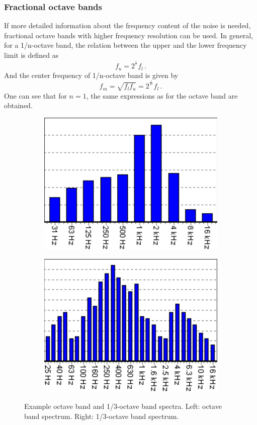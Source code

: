 \subsubsection*{Fractional octave bands}

If more detailed information about the frequency content of the noise is needed, fractional octave bands with higher frequency resolution can be used. In general, for a 1/n-octave band, the relation between the upper and the lower frequency limit is defined as
\begin{equation}
	f_u = 2^{^\frac{1}{n}}f_l\,.
\end{equation}
And the center frequency of 1/n-octave band is given by
\begin{equation}
	f_m = \sqrt{f_l f_u} = 2^{^{\frac{1}{2n}}}f_l\,.
\end{equation}
One can see that for $n = 1$, the same expressions as for the octave band are obtained.

\begin{figure}[H]
	\centering
	\begin{subfigure}[b]{0.49\textwidth}
		\centering
		\includegraphics[width=0.8\linewidth]{fig/octave_band.PNG}
	\end{subfigure}
	\begin{subfigure}[b]{0.49\textwidth}
		\centering
		\includegraphics[width=0.8\linewidth]{fig/one_third_octave_band.PNG}
	\end{subfigure}
	\caption{Example octave band and 1/3-octave band spectra. Left: octave band spectrum. Right: 1/3-octave band spectrum. \cite{octave_band} }
	\label{fig:octave_band_filters}
\end{figure}

